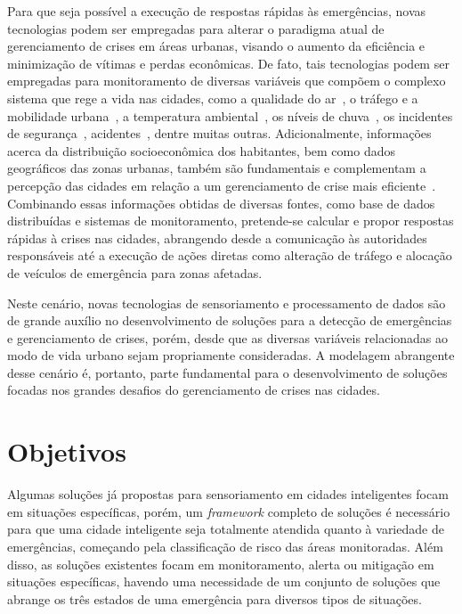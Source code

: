 \begin{refsection}
Para que seja possível a execução de respostas rápidas às emergências, novas tecnologias podem ser empregadas para alterar o paradigma atual de gerenciamento de crises em áreas urbanas, visando o aumento da eficiência e minimização de vítimas e perdas econômicas. De fato, tais tecnologias podem ser empregadas para monitoramento de diversas variáveis que compõem o complexo sistema que rege a vida nas cidades, como a qualidade do ar~\cite{Silva_2019}, o tráfego e a mobilidade urbana~\cite{Calderoni_2014}, a temperatura ambiental~\cite{silva2020climifba}, os níveis de chuva~\cite{Xu_2016}, os incidentes de segurança~\cite{Alkhatib2019771}, acidentes~\cite{Thompson_2010}, dentre muitas outras. Adicionalmente, informações acerca da distribuição socioeconômica dos habitantes, bem como dados geográficos das zonas urbanas, também são fundamentais e complementam a percepção das cidades em relação a um gerenciamento de crise mais eficiente~\cite{KONTOKOSTA2018272}. Combinando essas informações obtidas de diversas fontes, como base de dados distribuídas e sistemas de monitoramento, pretende-se calcular e propor respostas rápidas à crises nas cidades, abrangendo desde a comunicação às autoridades responsáveis até a execução de ações diretas como alteração de tráfego e alocação de veículos de emergência para zonas afetadas.

Neste cenário, novas tecnologias de sensoriamento e processamento de dados são de grande auxílio no desenvolvimento de soluções para a detecção de emergências e gerenciamento de crises, porém, desde que as diversas variáveis relacionadas ao modo de vida urbano sejam propriamente consideradas. A modelagem abrangente desse cenário é, portanto, parte fundamental para o desenvolvimento de soluções focadas nos grandes desafios do gerenciamento de crises nas cidades.

\section{Objetivos}\label{sec:objetivos}

Algumas soluções já propostas para sensoriamento em cidades inteligentes focam em situações específicas, porém, um \textit{framework} completo de soluções é necessário para que uma cidade inteligente seja totalmente atendida quanto à variedade de emergências, começando pela classificação de risco das áreas monitoradas. Além disso, as soluções existentes focam em monitoramento, alerta ou mitigação em situações específicas, havendo uma necessidade de um conjunto de soluções que abrange os três estados de uma emergência para diversos tipos de situações.


\end{refsection}
